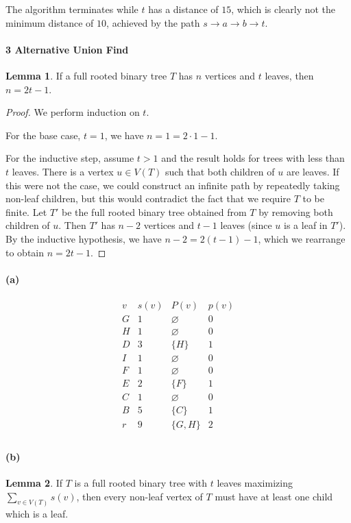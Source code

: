 \documentclass[12pt]{article}
\newcommand{\pnum}[1]{\paragraph{#1}}
\theoremstyle{definition}
\newtheorem{lemma}{Lemma}
\renewcommand{\emptyset}{\varnothing}
\newcommand{\<}{\langle}
\renewcommand{\>}{\rangle}
\begin{document}
The algorithm terminates while $t$ has a distance of $15$, which is clearly not the minimum distance of $10$, achieved by the path $s \to a \to b \to t$.





\newpage
\pnum{3 Alternative Union Find}

\begin{lemma}
    If a full rooted binary tree $T$ has $n$ vertices and $t$ leaves, then $n = 2t - 1$.
\end{lemma}

\begin{proof}
    We perform induction on $t$.

    For the base case, $t = 1$, we have $n = 1 = 2\cdot 1 - 1$.

    For the inductive step, assume $t > 1$ and the result holds for trees with less than $t$ leaves.
    There is a vertex $u \in V(T)$ such that both children of $u$ are leaves.
    If this were not the case, we could construct an infinite path by repeatedly taking non-leaf children, but this would contradict the fact that we require $T$ to be finite.
    Let $T'$ be the full rooted binary tree obtained from $T$ by removing both children of $u$.
    Then $T'$ has $n - 2$ vertices and $t - 1$ leaves (since $u$ is a leaf in $T'$).
    By the inductive hypothesis, we have $n - 2 = 2(t - 1) - 1$, which we rearrange to obtain $n = 2t - 1$.
\end{proof}

\pnum{(a)}

\[
    \begin{array}{c|ccc}
        v & s(v) & P(v) & p(v) \\
        \hline
        G & 1 & \emptyset & 0 \\
        H & 1 & \emptyset & 0 \\
        D & 3 & \{H\} & 1 \\
        I & 1 & \emptyset & 0 \\
        F & 1 & \emptyset & 0 \\
        E & 2 & \{F\} & 1 \\
        C & 1 & \emptyset & 0 \\
        B & 5 & \{C\} & 1 \\
        r & 9 & \{G, H\} & 2 \\
    \end{array}
\]

\pnum{(b)}

\begin{lemma}
    If $T$ is a full rooted binary tree with $t$ leaves maximizing $\sum_{v \in V(T)} s(v)$, then every non-leaf vertex of $T$ must have at least one child which is a leaf.
\end{lemma}
\end{document}
